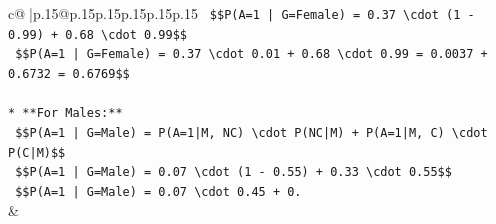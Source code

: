 \documentclass{article}
\begin{document}
{\begin{supertabular}{c@{$\;$}|p{.15\linewidth}@{}p{.15\linewidth}p{.15\linewidth}p{.15\linewidth}p{.15\linewidth}p{.15\linewidth}}
{{{\texttt{    \$\$P(A=1 | G=Female) = 0.37 \textbackslash{}cdot (1 {-} 0.99) + 0.68 \textbackslash{}cdot 0.99\$\$} \\
\texttt{    \$\$P(A=1 | G=Female) = 0.37 \textbackslash{}cdot 0.01 + 0.68 \textbackslash{}cdot 0.99 = 0.0037 + 0.6732 = 0.6769\$\$} \\
\\ 
\texttt{*   **For Males:**} \\
\texttt{    \$\$P(A=1 | G=Male) = P(A=1|M, NC) \textbackslash{}cdot P(NC|M) + P(A=1|M, C) \textbackslash{}cdot P(C|M)\$\$} \\
\texttt{    \$\$P(A=1 | G=Male) = 0.07 \textbackslash{}cdot (1 {-} 0.55) + 0.33 \textbackslash{}cdot 0.55\$\$} \\
\texttt{    \$\$P(A=1 | G=Male) = 0.07 \textbackslash{}cdot 0.45 + 0.} \\
            }
        }
    }
    & \\ \\


\end{supertabular}}
\end{document}
